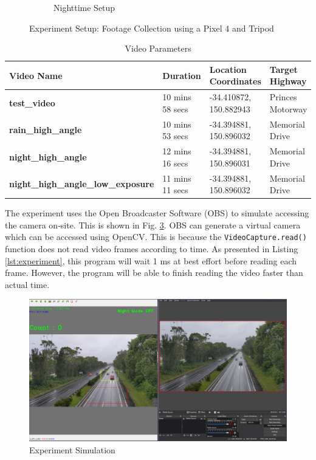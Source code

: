 \documentclass[12pt,a4paper,fleqn]{report}
\begin{document}
\begin{figure}[htbp]
\begin{subfigure}[htbp]{0.48\textwidth}
\begin{center}
        \end{center}
        \caption{Nighttime Setup}
        \label{fig:nighttime_exp}
    \end{subfigure}
    \caption{Experiment Setup: Footage Collection using a Pixel 4 and Tripod}
    \label{fig:experiment_setup}
\end{figure}


\begin{table}[htbp]
    \centering
    \begin{adjustbox}{width=1\textwidth}
    \begin{tabular}{|l|l|l|l|}
    \hline
    \textbf{Video Name} & \textbf{Duration} & \textbf{Location Coordinates} & \textbf{Target Highway} \\ \hline
    \textbf{test\_video} & 10 mins 58 secs & -34.410872, 150.882943 & Princes Motorway \\ \hline
    \textbf{rain\_high\_angle} & 10 mins 53 secs & -34.394881, 150.896032 & Memorial Drive \\ \hline
    \textbf{night\_high\_angle} & 12 mins 16 secs & -34.394881, 150.896031 & Memorial Drive \\ \hline
    \textbf{night\_high\_angle\_low\_exposure} & 11 mins 11 secs & -34.394881, 150.896032 & Memorial Drive \\ \hline
    \end{tabular}
\end{adjustbox}
\caption{Video Parameters}
\label{tab:expvidparam}
\end{table}

The experiment uses the Open Broadcaster Software (OBS) to simulate accessing the camera on-site.
This is shown in Fig. \ref{fig:exp_sim_obs}.
OBS can generate a virtual camera which can be accessed using OpenCV.
This is because the \texttt{VideoCapture.read()} function does not read video frames according to time.
As presented in Listing \ref{lst:experiment}, this program will wait 1 ms at best effort before reading
each frame.
However, the program will be able to finish reading the video faster than actual time.

\begin{figure}
    \begin{center}
        \includegraphics[width=\textwidth]{figures/exp_sim_obs.png}
    \end{center}
    \caption{Experiment Simulation}
    \label{fig:exp_sim_obs}
\end{figure}
\end{document}
